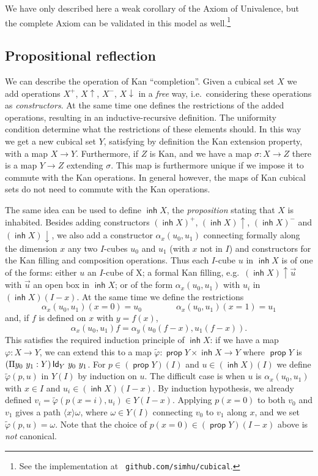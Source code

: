 \documentclass[a4paper,USenglish,draft]{lipics}
\DeclareMathOperator{\inh}{\mathsf{inh}}
\DeclareMathOperator{\propos}{\mathsf{prop}}
\newcommand{\Id}{{\sf Id}}
\newcommand{\rup}[1]{#1{\uparrow}}
\newcommand{\rdo}[1]{#1{\downarrow}}
\newcommand{\bind}[2]{{\langle}#1{\rangle}#2}
\begin{document}
\medskip

We have only described here a weak corollary of the Axiom of
Univalence, but the complete Axiom can be validated in this model as
well.\footnote{See the implementation at {\tt
    github.com/simhu/cubical}.}


\subsection{Propositional reflection}

We can describe the operation of Kan ``completion''. Given a cubical
set $X$ we add operations $X^+$, $\rup X$, $X^-$, $\rdo X$ in
a {\em free} way, i.e.\ considering these operations as {\em
  constructors}.  At the same time one defines the restrictions of the
added operations, resulting in an inductive-recursive definition.  The
uniformity condition determine what the restrictions of these elements
should.  In this way we get a new cubical set $Y$, satisfying by
definition the Kan extension property, with a map $X \to Y$.
Furthermore, if $Z$ is Kan, and we have a map $\sigma:X\to Z$ there is
a map $Y\to Z$ extending $\sigma$.  This map is furthermore unique if
we impose it to commute with the Kan operations.  In general however,
the maps of Kan cubical sets do not need to commute with the Kan
operations.

The same idea can be used to define $\inh X$, the {\em proposition}
stating that $X$ is inhabited.  Besides adding constructors $(\inh
X)^+$, $\rup {(\inh X)}$, $(\inh X)^-$ and $\rdo{(\inh X)}$, we
also add a constructor $\alpha_x(u_0,u_1)$ connecting formally along
the dimension $x$ any two $I$-cubes $u_0$ and $u_1$ (with $x$ not in
$I$) and constructors for the Kan filling and composition operations.
Thus each $I$-cube $u$ in $\inh X$ is of one of the forms: either $u$
an $I$-cube of X; a formal Kan filling, e.g.\ $\rup {(\inh X)} {\vec
  u}$ with $\vec u$ an open box in $\inh X$; or of the form
$\alpha_x(u_0,u_1)$ with $u_i$ in $(\inh X) (I-x)$.  At the same time
we define the restrictions
\[
\alpha_x(u_0,u_1)(x=0) = u_0 \qquad \qquad \alpha_x(u_0,u_1)(x=1) =
u_1
\]
and, if $f$ is defined on $x$ with $y=f(x)$,
\[
\alpha_x(u_0,u_1)f = \alpha_y(u_0(f-x),u_1(f-x)).
\]
This satisfies the required induction principle of $\inh X$: if we
have a map $\varphi : X \to Y$, we can extend this to a map
$\tilde\varphi : \propos Y \times \inh X \to Y$ where $\propos Y$ is
$(\Pi y_0~y_1 : Y) \, \Id_Y~y_0~y_1$.  For $p \in(\propos Y) (I)$ and
$u \in (\inh X) (I)$ we define $\tilde\varphi (p,u)$ in $Y (I)$ by
induction on $u$.  The difficult case is when $u$ is $\alpha_x (u_0,
u_1)$ with $x \in I$ and $u_i \in (\inh X) (I-x)$.  By induction
hypothesis, we already defined $v_i = \tilde\varphi (p (x = i), u_i)
\in Y (I-x)$.  Applying $p (x=0)$ to both $v_0$ and $v_1$ gives a path
$\bind x \omega$, where $\omega \in Y (I)$ connecting $v_0$ to $v_1$
along $x$, and we set $\tilde\varphi (p,u) = \omega$.  Note that the
choice of $p (x = 0) \in (\propos Y) (I-x)$ above is \emph{not}
canonical.
\end{document}
